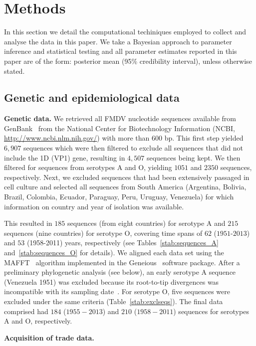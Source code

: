 \documentclass[10pt]{article}
\begin{document}
\section*{Methods}

In this section we detail the computational techiniques employed to collect and analyse the data in this paper.
We take a Bayesian approach to parameter inference and statistical testing and all parameter estimates reported in this paper are of the form: posterior mean (95\% credibility interval), unless otherwise stated.

\subsection*{Genetic and epidemiological data}

\textbf{Genetic data.}
We retrieved all FMDV nucleotide sequences available from GenBank~\citep{Benson2013} from the National Center for Biotechnology Information (NCBI, \url{ http://www.ncbi.nlm.nih.gov/}) with more than $600$ bp.
This first step yielded $6, 907$ sequences which were then filtered to exclude all sequences that did not include the 1D (VP1) gene, resulting in $4, 507$ sequences being kept.
We then filtered for sequences from serotypes A and O, yielding $1051$ and $2350$ sequences, respectively.
Next, we excluded sequences that had been extensively passaged in cell culture and selected all sequences from South America (Argentina, Bolivia, Brazil, Colombia, Ecuador, Paraguay, Peru, Uruguay, Venezuela) for which information on country and year of isolation was available.

This resulted in $185$ sequences (from eight countries) for serotype A and $215$ sequences (nine countries) for serotype O, covering time spans of $62$ ($1951$-$2013$) and $53$ (1958-2011) years, respectively (see Tables~\ref{stab:sequences_A} and~\ref{stab:sequences_O} for details).
We aligned each data set using the MAFFT~\citep{Katoh2002} algorithm implemented in the Geneious~\citep{Kearse2012} software package.
After a preliminary phylogenetic analysis (see below), an early serotype A sequence (Venezuela 1951) was excluded because its root-to-tip divergences was incompatible with its sampling date~\citep{Rambaut2016}.
For serotype O, five sequences were excluded under the same criteria (Table~\ref{stab:exclseqs}).
The final data comprised had $184$ ($1955-2013$) and $210$ ($1958-2011$) sequences for serotypes A and O, respectively.

\textbf{Acquisition of trade data.}
\end{document}
